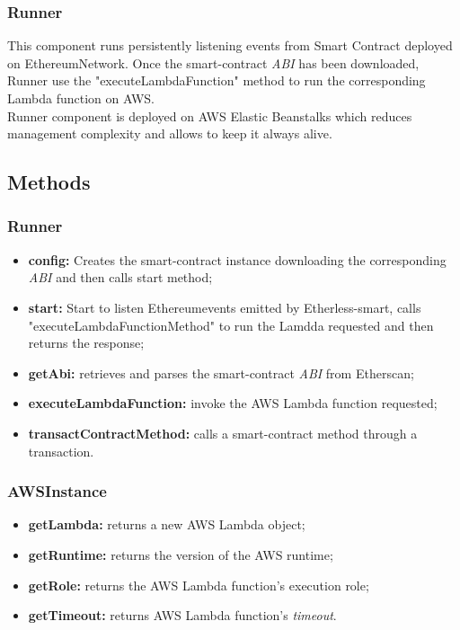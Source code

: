 \subsubsection{Runner}
This component runs persistently listening events from Smart Contract deployed on Ethereum\glo Network. Once the smart-contract \textit{ABI\glo} has been downloaded, Runner use the "executeLambdaFunction" method to run the corresponding Lambda function on AWS.\\ Runner component is deployed on AWS Elastic Beanstalks which reduces management complexity and allows to keep it always alive. 


\subsection{Methods}
\subsubsection{Runner}
\begin{itemize}
	\item \textbf{config:} Creates the smart-contract instance downloading the corresponding \textit{ABI\glo} and then calls start method;
	\item \textbf{start:} Start to listen Ethereum\glo events emitted by Etherless-smart, calls "executeLambdaFunctionMethod" to run the Lamdda requested and then returns the response;
	\item \textbf{getAbi:} retrieves and parses the smart-contract \textit{ABI\glo} from Etherscan;
	\item \textbf{executeLambdaFunction:} invoke the AWS Lambda function requested;
	\item \textbf{transactContractMethod:} calls a smart-contract method through a transaction.
\end{itemize}
\subsubsection{AWSInstance}
\begin{itemize}
	\item \textbf{getLambda:} returns a new AWS Lambda object;
	\item \textbf{getRuntime:} returns the version of the AWS runtime;
	\item \textbf{getRole:} returns the AWS Lambda function's execution role;
	\item \textbf{getTimeout:} returns AWS Lambda function's \textit{timeout\glos}. 
\end{itemize}
